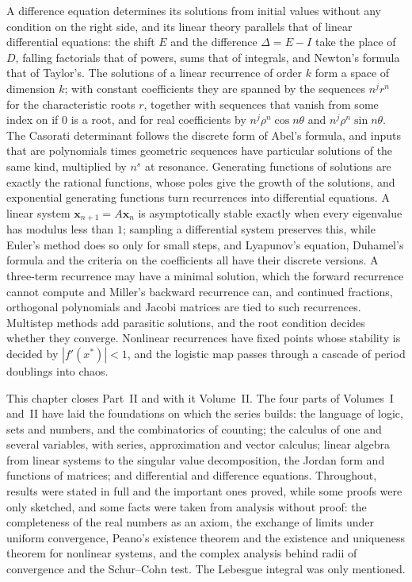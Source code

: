 \bigskip
A difference equation determines its solutions from initial values without any condition on the right side, and its linear theory parallels that of linear differential equations: the shift $E$ and the difference $\Delta=E-I$ take the place of $D$, falling factorials that of powers, sums that of integrals, and Newton's formula that of Taylor's. The solutions of a linear recurrence of order $k$ form a space of dimension $k$; with constant coefficients they are spanned by the sequences $n^jr^n$ for the characteristic roots $r$, together with sequences that vanish from some index on if $0$ is a root, and for real coefficients by $n^j\rho^n\cos n\theta$ and $n^j\rho^n\sin n\theta$. The Casorati determinant follows the discrete form of Abel's formula, and inputs that are polynomials times geometric sequences have particular solutions of the same kind, multiplied by $n^s$ at resonance. Generating functions of solutions are exactly the rational functions, whose poles give the growth of the solutions, and exponential generating functions turn recurrences into differential equations. A linear system $\mathbf x_{n+1}=A\mathbf x_n$ is asymptotically stable exactly when every eigenvalue has modulus less than $1$; sampling a differential system preserves this, while Euler's method does so only for small steps, and Lyapunov's equation, Duhamel's formula and the criteria on the coefficients all have their discrete versions. A three-term recurrence may have a minimal solution, which the forward recurrence cannot compute and Miller's backward recurrence can, and continued fractions, orthogonal polynomials and Jacobi matrices are tied to such recurrences. Multistep methods add parasitic solutions, and the root condition decides whether they converge. Nonlinear recurrences have fixed points whose stability is decided by $|f'(x^*)|<1$, and the logistic map passes through a cascade of period doublings into chaos.

This chapter closes Part~II and with it Volume~II. The four parts of Volumes~I and~II have laid the foundations on which the series builds: the language of logic, sets and numbers, and the combinatorics of counting; the calculus of one and several variables, with series, approximation and vector calculus; linear algebra from linear systems to the singular value decomposition, the Jordan form and functions of matrices; and differential and difference equations. Throughout, results were stated in full and the important ones proved, while some proofs were only sketched, and some facts were taken from analysis without proof: the completeness of the real numbers as an axiom, the exchange of limits under uniform convergence, Peano's existence theorem and the existence and uniqueness theorem for nonlinear systems, and the complex analysis behind radii of convergence and the Schur--Cohn test. The Lebesgue integral was only mentioned.

